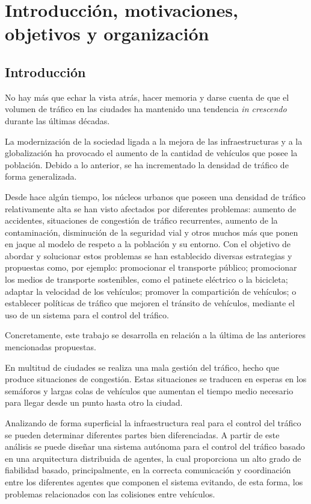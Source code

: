 \chapter{Introducción, motivaciones, objetivos y organización}
    \label{chap:one}

\section{Introducción}
No hay más que echar la vista atrás, hacer memoria y darse cuenta de que el volumen de tráfico en las ciudades ha mantenido una tendencia \textit{in crescendo} durante las últimas décadas. 

La modernización de la sociedad ligada a la mejora de las infraestructuras y a la globalización ha provocado el aumento de la cantidad de vehículos que posee la población. Debido a lo anterior, se ha incrementado la densidad de tráfico de forma generalizada. 

Desde hace algún tiempo, los núcleos urbanos que poseen una densidad de tráfico relativamente alta se han visto afectados por diferentes problemas: aumento de accidentes, situaciones de congestión de tráfico recurrentes, aumento de la contaminación, disminución de la seguridad vial y otros muchos más que ponen en jaque al modelo de respeto a la población y su entorno. Con el objetivo de abordar y solucionar estos problemas se han establecido diversas estrategias y propuestas como, por ejemplo: promocionar el transporte público; promocionar los medios de transporte sostenibles, como el patinete eléctrico o la bicicleta; adaptar la velocidad de los vehículos; promover la compartición de vehículos; o establecer políticas de tráfico que mejoren el tránsito de vehículos, mediante el uso de un sistema para el control del tráfico.

Concretamente, este trabajo se desarrolla en relación a la última de las anteriores mencionadas propuestas.

En multitud de ciudades se realiza una mala gestión del tráfico, hecho que produce situaciones de congestión. Estas situaciones se traducen en esperas en los semáforos y largas colas de vehículos que aumentan el tiempo medio necesario para llegar desde un punto hasta otro la ciudad.

Analizando de forma superficial la infraestructura real para el control del tráfico se pueden determinar diferentes partes bien diferenciadas. A partir de este análisis se puede diseñar una sistema autónoma para el control del tráfico basado en una arquitectura distribuida de agentes, la cual proporciona un alto grado de fiabilidad basado, principalmente, en la correcta comunicación y coordinación entre los diferentes agentes que componen el sistema evitando, de esta forma, los problemas relacionados con las colisiones entre vehículos.


